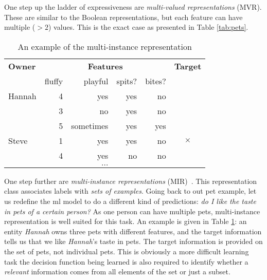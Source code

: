 One step up the ladder of expressiveness are \textit{multi-valued representations} (MVR).
These are similar to the Boolean representations, but each feature can have multiple ($> 2$) values.
This is the exact case as presented in Table \ref{tab:pets}.


\begin{table}
	\centering
	\caption{An example of the multi-instance representation\label{tab:mi}}
		\begin{tabular}{@{}lrrrrc@{}}
		\toprule
		\textbf{Owner} 	& \multicolumn{4}{c}{\textbf{Features}} 		& \textbf{Target} \\
			\cmidrule{2-5}
						& fluffy		& playful	& spits?		& bites?& 	\\
			\midrule

		Hannah			& 4			& yes		& yes		& no		& \checkmark \\
						& 3			& no			& yes		& no		&  \\
						& 5			& sometimes & yes		& yes	& \\
		\midrule
		Steve			& 1			& yes		& yes		& no		& $\mathbf{\times}$  \\
						& 4			& yes		& no			& no		& 	\\
		\midrule
		\multicolumn{6}{c}{$\ldots$} \\
		\bottomrule

		\end{tabular}
\end{table}



One step further are \textit{multi-instance representations} (MIR)~\cite{Dietterich:1997:SMI:249678.249682}.
This representation class associates labels with \textit{sets of examples}.
Going back to out pet example, let us redefine the \gls{ml} model to do a different kind of predictions: \textit{do I like the taste in pets of a certain person?}
As one person can have multiple pets, multi-instance representation is well suited for this task.
An example is given in Table \ref{tab:mi}: an entity \textit{Hannah} owns three pets with different features, and the target information tells us that we like \textit{Hannah}'s taste in pets.
The target information is provided on the set of pets, not individual pets.
This is obviously a more difficult learning task the decision function being learned is also required to identify whether a \textit{relevant} information comes from all elements of the set or just a subset.







